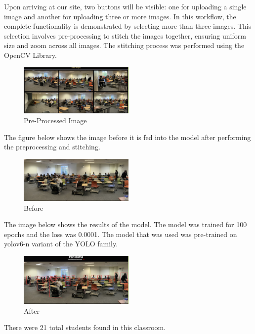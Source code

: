 Upon arriving at our site, two buttons will be visible: one for uploading a single image and another for uploading three or more images. In this workflow, the complete functionality is demonstrated by selecting more than three images. This selection involves pre-processing to stitch the images together, ensuring uniform size and zoom across all images. The stitching process was performed using the OpenCV Library.\\
\begin{figure}[h]
    \centering
    \includegraphics[width=0.5\textwidth]{images/Pre.png}
    \caption{Pre-Processed Image}
    \label{fig:before}
\end{figure}

The figure below shows the image before it is fed into the model after performing the preprocessing and stitching. \\
\begin{figure}[h]
    \centering
    \includegraphics[width=0.5\textwidth]{images/Before.png}
    \caption{Before}
    \label{fig:before}
\end{figure}

The image below shows the results of the model. The model was trained for 100 epochs and the loss was 0.0001. The model that was used was pre-trained on yolov6-n variant of the YOLO family. \\
\begin{figure}[h]
    \centering
    \includegraphics[width=0.5\textwidth]{images/After.png}
    \caption{After}
    \label{fig:after}
\end{figure}

There were 21 total students found in this classroom.
